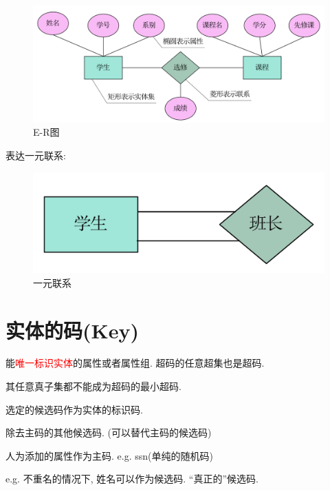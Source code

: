 \begin{figure}[H]
    \centering
    \includegraphics[width=.8\textwidth]{figure/db-8.pdf}
    \caption{E-R图}
\end{figure}

表达一元联系:
\begin{figure}[H]
    \centering
    \includegraphics[width=.3\textwidth]{figure/db-9.pdf}
    \caption{一元联系}
\end{figure}

\section{实体的码(Key)}

\begin{definition}[超码(Superkey)]
    能\textcolor{red}{唯一标识实体}的属性或者属性组. 超码的任意超集也是超码.
\end{definition}

\begin{definition}
    其任意真子集都不能成为超码的最小超码.
\end{definition}

\begin{definition}
    选定的候选码作为实体的标识码.
\end{definition}

\begin{definition}[替代码]
    除去主码的其他候选码. (可以替代主码的候选码)
\end{definition}

\begin{definition}[代理码]
    人为添加的属性作为主码. e.g. ssn(单纯的随机码)
\end{definition}

\begin{definition}[自然码]
    e.g. 不重名的情况下, 姓名可以作为候选码. “真正的”候选码.
\end{definition}

